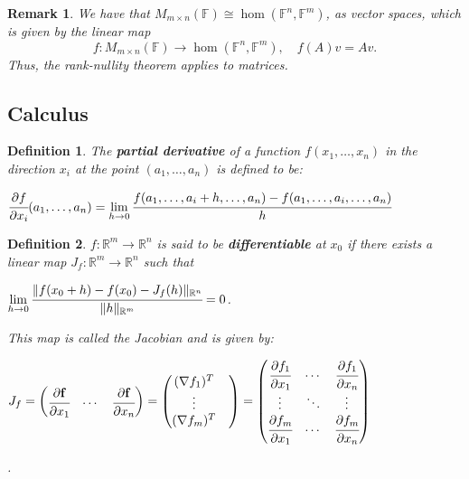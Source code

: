 \documentclass[12pt]{article}
\newcommand{\real}{\mathbb{R}}
\newcommand{\field}{\mathbb{F}}
\newcommand{\norm}[1]{\lVert #1 \rVert}
\newtheorem{defn}{Definition}[thm]
\newtheorem*{remark}{Remark}
\begin{document}
\begin{remark}
  We have that $M_{m \times n}(\field) \cong \hom(\field^n, \field^m)$, as vector spaces, which is given by the linear map
  \begin{equation*}
    f: M_{m \times n}(\field) \to \hom(\field^n, \field^m), \quad f(A)v = Av.
  \end{equation*}
  Thus, the rank-nullity theorem applies to matrices.
\end{remark}
\subsection{Calculus}

\begin{defn}
  The \textbf{partial derivative} of a function $f(x_1,\dots,x_n)$ in the direction $x_i$ at the point $(a_1, \dots, a_n)$ is defined to be:
  \begin{center}
    $\cfrac{\partial f}{\partial x_i}(a_1, \dots, a_n) = \lim\limits_{h \to 0} \cfrac{f(a_1,\dots, a_i + h, \dots, a_n) - f(a_1, \dots, a_i, \dots, a_n)}{h}$
  \end{center}
\end{defn}

\begin{defn}
  $f: \real^m \to \real^n$ is said to be \textbf{differentiable} at $x_0$ if there exists a linear map $J_f : \real^m \to \real^n$ such that
  \begin{center}
    $\lim\limits_{h \to 0} \cfrac{\norm{f(x_0 + h) - f(x_0) - J_f(h)}_{\real^n}}{\norm{h}_{\real^m}} = 0$.    
  \end{center}
  This map is called the Jacobian and is given by:
  \begin{center}
    $J_f =
    \begin{pmatrix}
      \cfrac{\partial \mathbf{f}}{\partial x_1} & \cdots & \cfrac{\partial \mathbf{f}}{\partial x_n}
    \end{pmatrix}
    =
    \begin{pmatrix}
      (\nabla f_1)^T \\
      \vdots &       \\
      (\nabla f_m)^T 
    \end{pmatrix}
    =
    \begin{pmatrix}
      \cfrac{\partial f_1}{\partial x_1} & \cdots & \cfrac{\partial f_1}{\partial x_n} \\
      \vdots & \ddots & \vdots \\ 
      \cfrac{\partial f_m}{\partial x_1} & \cdots & \cfrac{\partial f_m}{\partial x_n} \\
    \end{pmatrix}$
  \end{center}.
\end{defn}
\end{document}
